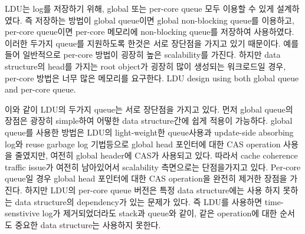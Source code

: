 \ifkor
LDU는 log를 저장하기 위해, global 또는 per-core queue 모두 이용할 수 있게 설계하였다.
즉 저장하는 방법이 global queue이면 global non-blocking queue를 이용하고, per-core queue이면
per-core 메모리에 non-blocking queue를 저장하여 사용하였다. 
이러한 두가지 queue를 지원하도록 한것은 서로 장단점을 가지고 있기 때문이다.
예를 들어 일반적으로 per-core 방법이 굉장히 높은 scalability를 가진다. 
하지만 data structure의 head를 가지는 root object가 굉장히 많이 생성되는 워크로드일 경우,
per-core 방법은 너무 많은 메모리를 요구한다.
\else
LDU design using both global queue and per-core queue.











\fi

\ifkor
이와 같이 LDU의 두가지 queue는 서로 장단점을 가지고 있다. 
먼저 global queue의 장점은 광장히 simple하여 어떻한 data structure간에 쉽게 적용이 가능하다.
global queue를 사용한 방법은 LDU의 light-weight한 queue사용과 update-side absorbing log와
reuse garbage log 기법등으로 global head 포인터에 대한 CAS operation 사용을 줄였지만, 여전히 global
header에 CAS가 사용되고 있다. 
따라서 cache coherence traffic issue가 여전히 남아있어서 scalability 측면으로는 단점을가지고 있다.
Per-core queue일 경우 global head 포인터에 대한 CAS operation을 완전히 제거한 장점을 가진다.
하지만 LDU의 per-core queue 버전은 특정 data structure에는 사용 하지 못하는 data structure의
dependency가 있는 문제가 있다.
즉 LDU를 사용하면 time-senstivive log가 제거되었더라도 stack과 queue와 같이, 같은 operation에 대한 순서도
중요한 data structure는 사용하지 못한다.
\else


